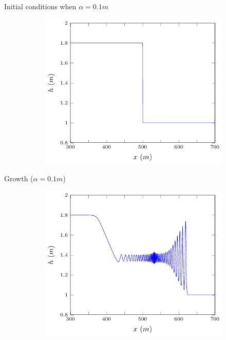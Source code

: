 \documentclass[pdf]{beamer}
\begin{document}
\begin{frame}{Initial conditions when $\alpha = 0.1m$}
	\begin{figure}
		\centering
		\begin{subfigure}{0.75\textwidth}
			\includegraphics[width=\textwidth]{../Pics/init/DBs12/1-figure0.pdf}
		\end{subfigure}%
	\end{figure}
\end{frame}

\begin{frame}{Growth ($\alpha = 0.1m$)}
	\begin{figure}
		\begin{subfigure}{0.75\textwidth}
			\includegraphics[width=\textwidth]{../Pics/DBstruct/12.pdf}
		\end{subfigure}
	\end{figure}
\end{frame}
\end{document}
